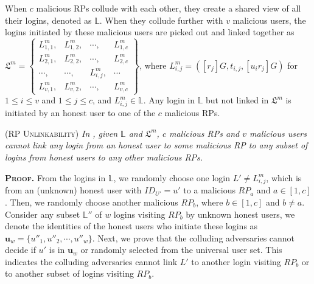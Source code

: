 When $c$ malicious RPs collude with each other, they create a shared view of all their logins, denoted as $\mathbb{L}$.
When they collude further with $v$ malicious users, the logins initiated by these malicious users are picked out and linked together as
$\mathfrak{L}^m=\left \{ \begin{matrix}
L^m_{1,1},&L^m_{1,2},&\cdots,&L^m_{1,c}\\
L^m_{2,1},& L^m_{2,2},&\cdots,&L^m_{2,c}\\
\cdots,&\cdots,&L^m_{i,j},&\cdots\\
L^m_{v,1},&L^m_{v,2},&\cdots,&L^m_{v,c}
\end{matrix}\right\}$,
where $L^m_{i, j}=([r_j]G, t_{i,j}, [u_ir_j]G)$ for $1 \le i \le v$ and $1 \le j \le c$, and $L^m_{i,j} \in \mathbb{L}$. Any login in $\mathbb{L}$ but not linked in $\mathfrak{L}^m$ is initiated by an honest user to one of the $c$ malicious RPs.


\begin{lemma}
\textsc{(RP Unlinkability)} \emph{In \usso, given $\mathbb{L}$ and $\mathfrak{L}^m$, $c$ malicious RPs and $v$ malicious users cannot link any login from an honest user to some malicious RP to any subset of logins from honest users to any other malicious RPs.}
\end{lemma}


\noindent\textbf{\textsc{Proof.}} From the logins in $\mathbb{L}$,
 we randomly choose one login $L' \neq L^m_{i,j}$,
 which is from an (unknown) honest user with $ID_{U'}=u'$ to a malicious $RP_a$ and $a \in [1,c]$.
Then, we randomly choose another malicious $RP_b$, where $b \in [1,c]$ and $b \neq a$.
Consider any subset $\mathbb{L}''$ of $w$ logins visiting $RP_b$ by unknown honest users,
 we denote the identities of the honest users who initiate these logins as $\mathbf{u}_w=\{{u''_1}, {u''_2}, \cdots, {u''_w}\}$.
Next, we prove that the colluding adversaries cannot decide if $u'$ is in $\mathbf{u}_w$ or randomly selected from the universal user set.
This indicates the colluding adversaries cannot link $L'$ to another login visiting $RP_b$
    or to another subset of logins visiting $RP_b$.

